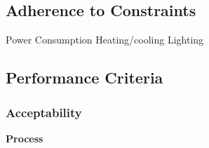 \documentclass{report}
\begin{document}
\subsection{Adherence to Constraints}
Power Consumption
Heating/cooling
Lighting
 
\subsection{Performance Criteria}
\subsubsection{Acceptability}

\textbf{Process}


\end{document}
